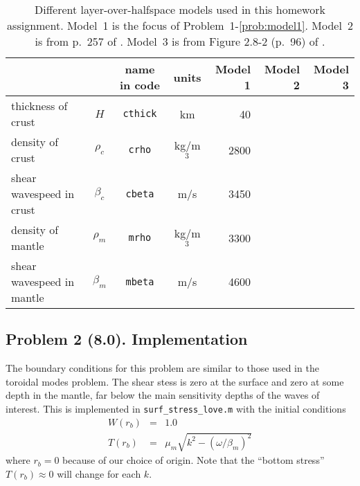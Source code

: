 \documentclass[11pt,titlepage,fleqn]{article}
\begin{document}
\begin{enumerate}
\begin{table}[h]
\centering
\caption[]
{{
Different layer-over-halfspace models used in this homework assignment.
Model~1 is the focus of Problem~1-\ref{prob:model1}.
Model~2 is from p.~257 of \citet{AkiRichardsE2}.
Model~3 is from  Figure 2.8-2 (p.~96) of \citet{SteinWysession}.
\label{tab:models}
}}
\tgap
\begin{tabular}{||l|c|c|c|r|r|r||}
\hline\hline
& & name in code & units & Model 1 & Model 2 & Model 3 \\
\hline\hline
thickness of crust        & $H$       & \verb+cthick+ & km       & 40 & & \\ \hline
density of crust          & $\rho_c$  & \verb+crho+   & kg/m$^3$ & 2800 & & \\ \hline
shear wavespeed in crust  & $\beta_c$ & \verb+cbeta+  & m/s      & 3450 & & \\ \hline
density of mantle         & $\rho_m$  & \verb+mrho+   & kg/m$^3$ & 3300 & & \\ \hline
shear wavespeed in mantle & $\beta_m$ & \verb+mbeta+  & m/s      & 4600 & & \\
\hline\hline
\end{tabular}
\end{table}

\end{enumerate}



\subsection*{Problem 2 (8.0). Implementation}

The boundary conditions for this problem are similar to those used in the toroidal modes problem. The shear stess is zero at the surface and zero at some depth in the mantle, far below the main sensitivity depths of the waves of interest. This is implemented in \verb+surf_stress_love.m+ with the initial conditions
%
\begin{eqnarray}
W(r_b) &=& 1.0
\label{Wbase}
\\
T(r_b) &=& \mu_m \sqrt{k^2 - (\omega/\beta_m)^2}
\label{Tbase}
\end{eqnarray}
%
where $r_b = 0$ because of our choice of origin. Note that the ``bottom stress'' $T(r_b) \approx 0$ will change for each $k$.
%
%
\end{document}
